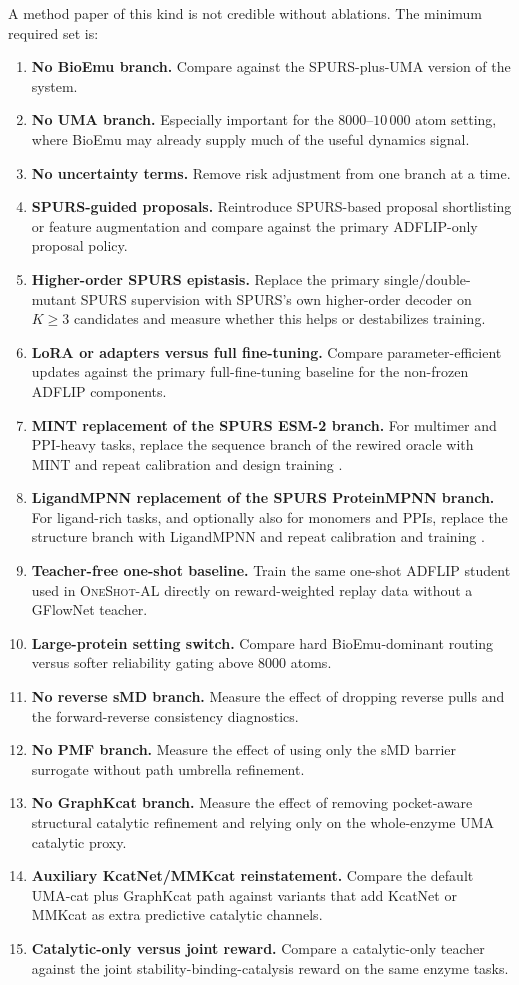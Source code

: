 \documentclass[11pt]{article}
\newcommand{\methodIII}{\textsc{OneShot-AL}}
\begin{document}
	A method paper of this kind is not credible without ablations. The minimum required set is:
	\begin{enumerate}[leftmargin=1.5em]
		\item \textbf{No BioEmu branch.} Compare against the SPURS-plus-UMA version of the system.
		\item \textbf{No UMA branch.} Especially important for the $8000$--$10\,000$ atom setting, where BioEmu may already supply much of the useful dynamics signal.
		\item \textbf{No uncertainty terms.} Remove risk adjustment from one branch at a time.
		\item \textbf{SPURS-guided proposals.} Reintroduce SPURS-based proposal shortlisting or feature augmentation and compare against the primary ADFLIP-only proposal policy.
		\item \textbf{Higher-order SPURS epistasis.} Replace the primary single/double-mutant SPURS supervision with SPURS's own higher-order decoder on $K\ge 3$ candidates and measure whether this helps or destabilizes training.
		\item \textbf{LoRA or adapters versus full fine-tuning.} Compare parameter-efficient updates against the primary full-fine-tuning baseline for the non-frozen ADFLIP components.
		\item \textbf{MINT replacement of the SPURS ESM-2 branch.} For multimer and PPI-heavy tasks, replace the sequence branch of the rewired oracle with MINT and repeat calibration and design training \citep{ullanat2025mint}.
		\item \textbf{LigandMPNN replacement of the SPURS ProteinMPNN branch.} For ligand-rich tasks, and optionally also for monomers and PPIs, replace the structure branch with LigandMPNN and repeat calibration and training \citep{dauparas2025ligandmpnn}.
		\item \textbf{Teacher-free one-shot baseline.} Train the same one-shot ADFLIP student used in \methodIII{} directly on reward-weighted replay data without a GFlowNet teacher.
		\item \textbf{Large-protein setting switch.} Compare hard BioEmu-dominant routing versus softer reliability gating above $8000$ atoms.
		\item \textbf{No reverse sMD branch.} Measure the effect of dropping reverse pulls and the forward-reverse consistency diagnostics.
		\item \textbf{No PMF branch.} Measure the effect of using only the sMD barrier surrogate without path umbrella refinement.
		\item \textbf{No GraphKcat branch.} Measure the effect of removing pocket-aware structural catalytic refinement and relying only on the whole-enzyme UMA catalytic proxy.
		\item \textbf{Auxiliary KcatNet/MMKcat reinstatement.} Compare the default UMA-cat plus GraphKcat path against variants that add KcatNet or MMKcat as extra predictive catalytic channels.
		\item \textbf{Catalytic-only versus joint reward.} Compare a catalytic-only teacher against the joint stability-binding-catalysis reward on the same enzyme tasks.
	\end{enumerate}
\end{document}

